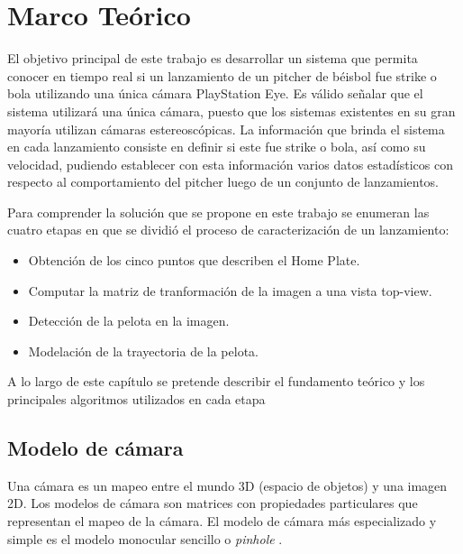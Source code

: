 \chapter{Marco Teórico}\label{chapter:theorical}

El objetivo principal de este trabajo es desarrollar un sistema que permita conocer en tiempo real si un lanzamiento de un pitcher de béisbol fue strike o bola utilizando una única cámara PlayStation Eye. Es válido señalar que el sistema utilizará una única cámara, puesto que los sistemas existentes en su gran mayoría utilizan cámaras estereoscópicas. La información que brinda el sistema en cada lanzamiento consiste en definir si este fue strike o bola, así como su velocidad, pudiendo establecer con esta información varios datos estadísticos con respecto al comportamiento del pitcher luego de un conjunto de lanzamientos.

Para comprender la solución que se propone en este trabajo se enumeran las cuatro etapas en que se dividió el proceso de caracterización de un lanzamiento:

\begin{itemize}
    \item Obtención de los cinco puntos que describen el Home Plate.
    \item Computar la matriz de tranformación de la imagen a una vista top-view.
    \item Detección de la pelota en la imagen.
    \item Modelación de la trayectoria de la pelota.
\end{itemize}

A lo largo de este capítulo se pretende describir el fundamento teórico y los principales algoritmos utilizados en cada etapa

\section{Modelo de cámara}

Una cámara es un mapeo entre el mundo 3D (espacio de objetos) y una imagen 2D. Los modelos de cámara son matrices con propiedades particulares que representan el mapeo de la cámara. El modelo de cámara más especializado y simple es el modelo monocular sencillo o \textit{pinhole} \cite{RichardAndrew}.\\

